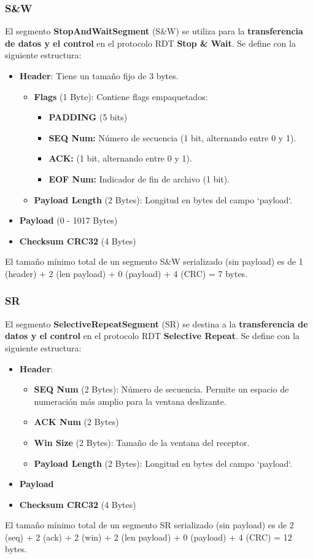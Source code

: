 \documentclass[a4paper,10pt]{article}
\begin{document}
\subsubsection{S\&W}
El segmento \textbf{StopAndWaitSegment} (S\&W) se utiliza para la \textbf{transferencia de datos y el control} en el protocolo RDT \textbf{Stop \& Wait}. Se define con la siguiente estructura:
\begin{itemize}
    \item \textbf{Header}: Tiene un tamaño fijo de 3 bytes.
    \begin{itemize}
        \item \textbf{Flags} (1 Byte): Contiene flags empaquetados:
        \begin{itemize}
        \item \textbf{PADDING} (5 bits)
        \item \textbf{SEQ Num:} Número de secuencia (1 bit, alternando entre 0 y 1).
        \item \textbf{ACK:} (1 bit, alternando entre 0 y 1).
        \item \textbf{EOF Num:} Indicador de fin de archivo (1 bit).
        \end{itemize}
        \item \textbf{Payload Length} (2 Bytes): Longitud en bytes del campo `payload`.
    \end{itemize}
    \item \textbf{Payload} (0 - 1017 Bytes)
    \item \textbf{Checksum CRC32} (4 Bytes)
\end{itemize}
El tamaño mínimo total de un segmento S\&W serializado (sin payload) es de 1 (header) + 2 (len payload) + 0 (payload) + 4 (CRC) = 7 bytes.

\subsubsection{SR}
El segmento \textbf{SelectiveRepeatSegment} (SR) se destina a la \textbf{transferencia de datos y el control} en el protocolo RDT \textbf{Selective Repeat}. Se define con la siguiente estructura:
\begin{itemize}
    \item \textbf{Header}:
    \begin{itemize}
        \item \textbf{SEQ Num} (2 Bytes): Número de secuencia. Permite un espacio de numeración más amplio para la ventana deslizante.
        \item \textbf{ACK Num} (2 Bytes)
        \item \textbf{Win Size} (2 Bytes): Tamaño de la ventana del receptor.
        \item \textbf{Payload Length} (2 Bytes): Longitud en bytes del campo `payload`.
    \end{itemize}
    \item \textbf{Payload}
    
    \item \textbf{Checksum CRC32} (4 Bytes)
\end{itemize}
El tamaño mínimo total de un segmento SR serializado (sin payload) es de 2 (seq) + 2 (ack) + 2 (win) + 2 (len payload) + 0 (payload) + 4 (CRC) = 12 bytes.
\end{document}
